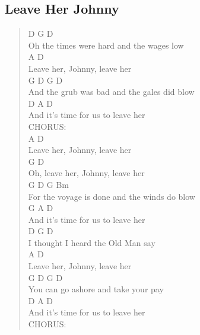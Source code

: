 \documentclass[11pt]{article}
\begin{document}
\subsection{Leave Her Johnny}
\label{sec:org629de82}
\begin{verse}
D                              G      D\\
Oh the times were hard and the wages low\\
A                  D\\
Leave her, Johnny, leave her\\
\hspace*{8em}G        D           G         D\\
And the grub was bad and the gales did blow\\
\hspace*{9em}D        A     D\\
And it's time for us to leave her\\
\vspace*{1em}
CHORUS:\\
A                  D\\
Leave her, Johnny, leave her\\
\hspace*{4em}G                  D\\
Oh, leave her, Johnny, leave her\\
\hspace*{8em}G         D            G        Bm\\
For the voyage is done and the winds do blow\\
\hspace*{9em}G        A     D\\
And it's time for us to leave her\\
\vspace*{1em}
D                     G       D\\
I thought I heard the Old Man say\\
A                  D\\
Leave her, Johnny, leave her\\
\hspace*{8em}G    D        G         D\\
You can go ashore and take your pay\\
\hspace*{9em}D        A     D\\
And it's time for us to leave her\\
\vspace*{1em}
CHORUS:\\

\end{verse}
\end{document}
